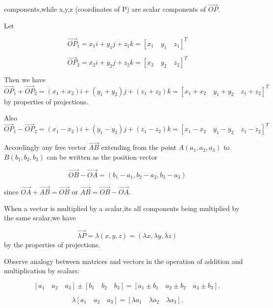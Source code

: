 \documentclass[11pt]{amsbook}
\begin{document}

components,while x,y,z (coordinates of P) 
are scalar components of 
$\vec{OP} $.

Let

$$  \vec{OP}_1 = x_1 i + y_1 j + z_1 k = 
\left[ x_1 \quad y_1 \quad z_1 \right]  ^T $$

$$  \vec{OP}_2 = x_2 i + y_2 j + z_2 k =
\left[ x_2 \quad y_2 \quad z_2 \right]  ^T $$

Then we have
$$  \vec{OP}_1 + \vec{OP}_2 =
\left( x_1 + x_2 \right)  i + 
\left( y_1 + y_2 \right)  j + 
\left( z_1 + z_2  \right) k =
 \left[ x_1 + x_2 \quad y_1 + y_2 \quad z_1 + z_2 \right]  ^T $$
by properties of projections.

 
 Also
 $$  \vec{OP}_1 - \vec{OP}_2 =
 \left( x_1 - x_2 \right)  i + 
 \left( y_1 - y_2 \right)  j + 
 \left( z_1 - z_2  \right) k =
 \left[ x_1 - x_2 \quad y_1 - y_2 \quad z_1 - z_2 \right]  ^T $$
 
 Accordingly any free vector 
 $ \vec{AB} $
 extending from the point
 $ A\left(a_1 , a_2 ,  a_3 \right)  $
 to
 $ B\left(b_1 , b_2 , b_3 \right)  $
 can be written as the position vector
 
  $$  \vec{OB} - \vec{OA} =
  \left( b_1 - a_1 , b_2 - a_2 ,b_3 - a_3 \right)   $$
  
  since
  $  \vec{OA} + \vec{AB} = \vec{OB} $
  or
  $  \vec{AB} =  \vec{OB} - \vec{OA} $.
  
  When a vector is multiplied by a scalar,its all components
  being multiplied by the same scalar,we have
  
   $$  \vec{\lambda P} =
  \lambda \left( x , y , z \right) = 
  \left(\lambda x , \lambda y ,\lambda z \right)  $$
  by the properties of projections.
  
Observe analogy between matrices and 
vectors in the operation of 
addition and multiplication by scalars:	
 
 $$ \left[ a_1 \quad a_2 \quad a_3 \right] \pm  
\left[ b_1 \quad b_2 \quad b_3 \right]=
\left[ a_1\pm b_1 \quad  a_2\pm b_2 \quad  a_3\pm b_3 \right], $$ 


 $$ \lambda \left[ a_1 \quad a_2  \quad a_3 \right] = 
   \left[ \lambda a_1 \quad \lambda a_2 \quad  \lambda a_3 \right].
 $$ 




\end{document}
